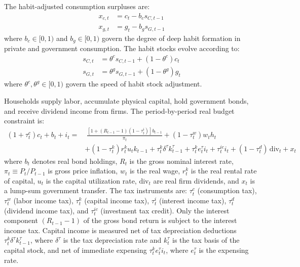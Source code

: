 \documentclass[article,11pt,letterpaper,fleqn]{article}
\theoremstyle{definition}
\numberwithin{equation}{section}
\begin{document}
The habit-adjusted consumption surpluses are:
\begin{align}
x_{c,t} &= c_t - b_c s_{C,t-1} \label{eq:xc} \\
x_{g,t} &= g_t - b_g s_{G,t-1} \label{eq:xg}
\end{align}
where $b_c \in [0,1)$ and $b_g \in [0,1)$ govern the degree of deep habit formation in private and government consumption. The habit stocks evolve according to:
\begin{align}
s_{C,t} &= \theta^c s_{C,t-1} + (1-\theta^c) c_t \label{eq:sC} \\
s_{G,t} &= \theta^g s_{G,t-1} + (1-\theta^g) g_t \label{eq:sG}
\end{align}
where $\theta^c, \theta^g \in [0,1)$ govern the speed of habit stock adjustment.

Households supply labor, accumulate physical capital, hold government bonds, and receive dividend income from firms. The period-by-period real budget constraint is:
\begin{equation}\label{eq:bc}
\begin{split}
(1+\tau_{t}^{c})c_{t} + b_{t} + i_{t} = &\;\frac{\left[1+(R_{t-1}-1)(1-\tau_{t}^{i})\right]b_{t-1}}{\pi_t} + (1-\tau_{t}^{w})w_{t}h_{t} \\
&+ (1-\tau_{t}^{k})r_{t}^{k}u_{t}k_{t-1} + \tau_{t}^{k}\delta^{\tau}k_{t-1}^{\tau} + \tau_{t}^{k}e_{t}^{\tau}i_{t} + \tau_{t}^{ic}i_{t} + (1-\tau_{t}^{d})\,\text{div}_{t} + x_{t}
\end{split}
\end{equation}
where $b_t$ denotes real bond holdings, $R_t$ is the gross nominal interest rate, $\pi_t \equiv P_t/P_{t-1}$ is gross price inflation, $w_t$ is the real wage, $r_t^k$ is the real rental rate of capital, $u_t$ is the capital utilization rate, $\text{div}_t$ are real firm dividends, and $x_t$ is a lump-sum government transfer. The tax instruments are: $\tau_t^c$ (consumption tax), $\tau_t^w$ (labor income tax), $\tau_t^k$ (capital income tax), $\tau_t^i$ (interest income tax), $\tau_t^d$ (dividend income tax), and $\tau_t^{ic}$ (investment tax credit). Only the interest component $(R_{t-1}-1)$ of the gross bond return is subject to the interest income tax. Capital income is measured net of tax depreciation deductions $\tau_t^k\delta^{\tau}k_{t-1}^{\tau}$, where $\delta^{\tau}$ is the tax depreciation rate and $k_t^{\tau}$ is the tax basis of the capital stock, and net of immediate expensing $\tau_t^k e_t^{\tau} i_t$, where $e_t^{\tau}$ is the expensing rate.
\end{document}
